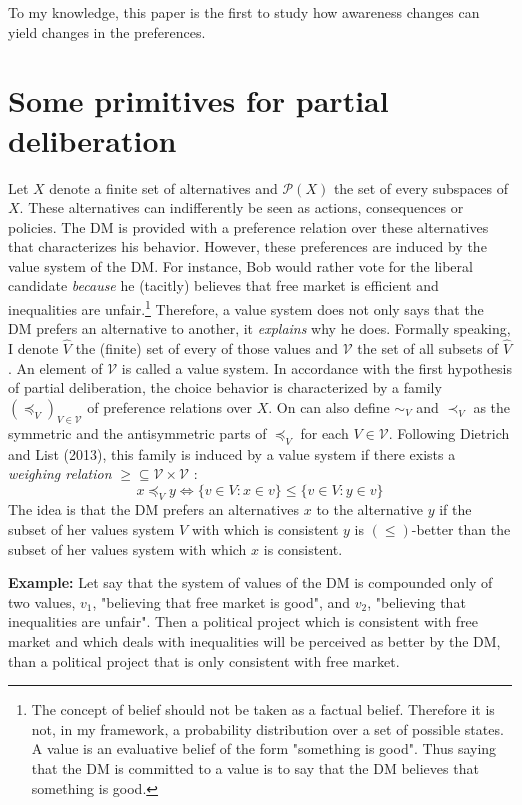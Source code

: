 \documentclass[11pt]{article}
\begin{document}
To my knowledge,  this paper is the first to study how awareness changes can yield changes in the preferences.  








\section{Some primitives for partial deliberation}
Let $X$ denote a finite set of alternatives and $\mathcal{P}(X)$ the set of every subspaces of $X$. These alternatives can indifferently be seen as actions, consequences or policies. The DM is provided with a preference relation over these alternatives that characterizes his behavior. However, these preferences are induced by the value system of the DM. For instance, Bob would rather vote for the liberal candidate \textit{because} he (tacitly) believes that free market is efficient and inequalities are unfair.\footnote{The concept of belief should not be taken as a factual belief. Therefore it is not, in my framework, a probability distribution over a set of possible states. A value is an evaluative belief of the form "something is good". Thus saying that the DM is committed to a value is to say that the DM believes that something is good.} Therefore, a value system does not only says that the DM prefers an alternative to another, it \textit{explains} why he does. Formally speaking, I denote $\hat{V}$ the (finite) set of every of those values and  $\mathcal{V}$ the set of all subsets of $\hat{V}$. An element of $\mathcal{V}$ is called a value system. In accordance with the first hypothesis of partial deliberation, the choice behavior is characterized by a family $(\preceq_V)_{V\in\mathcal{V}}$ of preference relations over $X$. On can also define $\sim_V$ and $\prec_V$ as the symmetric and the antisymmetric parts of $\preceq_V$ for each $V\in \mathcal{V}$. Following Dietrich and List (2013), this family is induced by a value system if there exists a \textit{weighing relation }$\geq \subseteq \mathcal{V}\times \mathcal{V}$ :
\[
x\preceq_{V} y \iff \{v\in V: x\in v \}\leq \{v\in V: y\in v \}
\]
The idea is that the DM prefers an alternatives $x$ to the alternative $y$ if the subset of her values system $V$ with which is consistent $y$  is $(\leq)$-better than the subset of her values system with which $x$ is consistent. 
\vspace{0,5cm}

\noindent 
\textbf{Example:} Let say that the system of values of the DM is compounded only of two values, $v_1$, "believing that free market is good", and  $v_2$, "believing that inequalities are unfair". Then a political project which is consistent with free market and which deals with inequalities will be perceived as better by the DM, than a political project that is only consistent with free market. 
\end{document}
